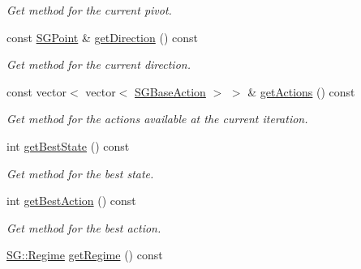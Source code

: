 \begin{DoxyCompactItemize}
\begin{DoxyCompactList}\small\item\em Get method for the current pivot. \end{DoxyCompactList}\item 
\mbox{\label{classSGIteration_a684abe31e6b4a3bdf94be1b3fdc6cc66}} 
const \hyperlink{classSGPoint}{S\+G\+Point} \& \hyperlink{classSGIteration_a684abe31e6b4a3bdf94be1b3fdc6cc66}{get\+Direction} () const
\begin{DoxyCompactList}\small\item\em Get method for the current direction. \end{DoxyCompactList}\item 
\mbox{\label{classSGIteration_afb42582d89f27f44d7e76a2f4ff8a684}} 
const vector$<$ vector$<$ \hyperlink{classSGBaseAction}{S\+G\+Base\+Action} $>$ $>$ \& \hyperlink{classSGIteration_afb42582d89f27f44d7e76a2f4ff8a684}{get\+Actions} () const
\begin{DoxyCompactList}\small\item\em Get method for the actions available at the current iteration. \end{DoxyCompactList}\item 
\mbox{\label{classSGIteration_a68b79d82fca24ae8fd10ef1192d9a89e}} 
int \hyperlink{classSGIteration_a68b79d82fca24ae8fd10ef1192d9a89e}{get\+Best\+State} () const
\begin{DoxyCompactList}\small\item\em Get method for the best state. \end{DoxyCompactList}\item 
\mbox{\label{classSGIteration_a7ea9824327feae3242915ee676b66ae5}} 
int \hyperlink{classSGIteration_a7ea9824327feae3242915ee676b66ae5}{get\+Best\+Action} () const
\begin{DoxyCompactList}\small\item\em Get method for the best action. \end{DoxyCompactList}\item 
\mbox{\label{classSGIteration_a6495e67cc2fd614335416e50aa725955}} 
\hyperlink{namespaceSG_a139e4dec41ea0f38aae1f93f60cfff60}{S\+G\+::\+Regime} \hyperlink{classSGIteration_a6495e67cc2fd614335416e50aa725955}{get\+Regime} () const

\end{DoxyCompactItemize}
